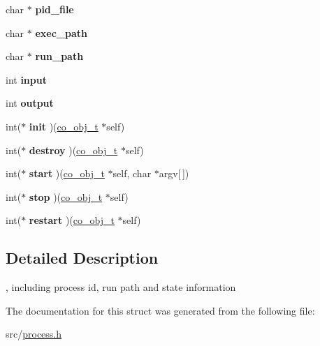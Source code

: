 \begin{DoxyCompactItemize}
\item 
\hypertarget{structco__process__t_ae73b023429180661bdee625cbf1da2ce}{char $\ast$ {\bfseries pid\-\_\-file}}\label{structco__process__t_ae73b023429180661bdee625cbf1da2ce}

\item 
\hypertarget{structco__process__t_ace3729257b036fb5e17e0db1aa8ffc0c}{char $\ast$ {\bfseries exec\-\_\-path}}\label{structco__process__t_ace3729257b036fb5e17e0db1aa8ffc0c}

\item 
\hypertarget{structco__process__t_a7787ccbd933ae38115557d75e7bb8c4c}{char $\ast$ {\bfseries run\-\_\-path}}\label{structco__process__t_a7787ccbd933ae38115557d75e7bb8c4c}

\item 
\hypertarget{structco__process__t_acf10ca9ac02775f16478c9a2241a8ae6}{int {\bfseries input}}\label{structco__process__t_acf10ca9ac02775f16478c9a2241a8ae6}

\item 
\hypertarget{structco__process__t_aeda75087324bf360bb555a2e9a146ad3}{int {\bfseries output}}\label{structco__process__t_aeda75087324bf360bb555a2e9a146ad3}

\item 
\hypertarget{structco__process__t_a1095e2cbf934b15bac1583f452c95a39}{int($\ast$ {\bfseries init} )(\hyperlink{structco__obj__t}{co\-\_\-obj\-\_\-t} $\ast$self)}\label{structco__process__t_a1095e2cbf934b15bac1583f452c95a39}

\item 
\hypertarget{structco__process__t_ae38c8137d75ef91b3071d80b762fd823}{int($\ast$ {\bfseries destroy} )(\hyperlink{structco__obj__t}{co\-\_\-obj\-\_\-t} $\ast$self)}\label{structco__process__t_ae38c8137d75ef91b3071d80b762fd823}

\item 
\hypertarget{structco__process__t_ab3eeeda3839876563540a1317903a0ad}{int($\ast$ {\bfseries start} )(\hyperlink{structco__obj__t}{co\-\_\-obj\-\_\-t} $\ast$self, char $\ast$argv\mbox{[}$\,$\mbox{]})}\label{structco__process__t_ab3eeeda3839876563540a1317903a0ad}

\item 
\hypertarget{structco__process__t_a9b9a29991575532d3ec8ef67b51229b8}{int($\ast$ {\bfseries stop} )(\hyperlink{structco__obj__t}{co\-\_\-obj\-\_\-t} $\ast$self)}\label{structco__process__t_a9b9a29991575532d3ec8ef67b51229b8}

\item 
\hypertarget{structco__process__t_afa61b0d3d4e43444bf25455299c8b5d3}{int($\ast$ {\bfseries restart} )(\hyperlink{structco__obj__t}{co\-\_\-obj\-\_\-t} $\ast$self)}\label{structco__process__t_afa61b0d3d4e43444bf25455299c8b5d3}

\end{DoxyCompactItemize}


\subsection{Detailed Description}
, including process id, run path and state information 

The documentation for this struct was generated from the following file\-:\begin{DoxyCompactItemize}
\item 
src/\hyperlink{process_8h}{process.\-h}\end{DoxyCompactItemize}
